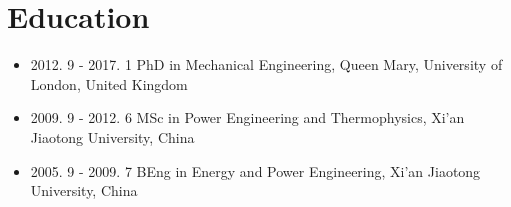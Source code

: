 \documentclass[letterpaper]{article}
\begin{document}
\vspace{-12pt}
\section*{Education}
\vspace{-10pt}
\begin{itemize}
  \item 2012. 9 - 2017. 1 PhD in Mechanical Engineering, Queen Mary, University of London, United Kingdom
  \item 2009. 9 - 2012. 6 MSc in Power Engineering and Thermophysics, Xi’an Jiaotong University, China
  \item 2005. 9 - 2009. 7 BEng in Energy and Power Engineering, Xi’an Jiaotong University, China
\end{itemize}

\vspace{-12pt}
\end{document}
